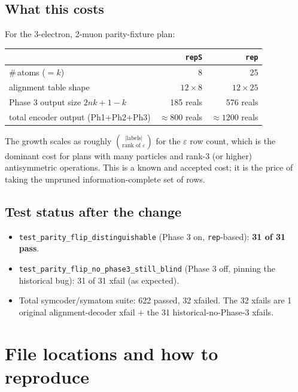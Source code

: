 \documentclass[a4paper,11pt]{article}
\begin{document}
\subsection{What this costs}

For the 3-electron, 2-muon parity-fixture plan:

\medskip
\noindent
\begin{tabular}{lrr}
\toprule
                                    & \texttt{repS}   & \texttt{rep} \\
\midrule
\#\,atoms ($=k$)                    & 8               & 25 \\
alignment table shape               & $12 \times 8$   & $12 \times 25$ \\
Phase 3 output size $2nk+1-k$       & 185 reals       & 576 reals \\
total encoder output (Ph1+Ph2+Ph3)  & $\approx 800$ reals & $\approx 1200$ reals \\
\bottomrule
\end{tabular}
\medskip

\noindent
The growth scales as roughly
$\binom{|\text{labels}|}{\text{rank of $\varepsilon$}}$ for the
$\varepsilon$ row count, which is the dominant cost for plans with
many particles and rank-3 (or higher) antisymmetric operations.  This
is a known and accepted cost; it is the price of taking the unpruned
information-complete set of rows.

\subsection{Test status after the change}

\begin{itemize}[nosep]
  \item \texttt{test\_parity\_flip\_distinguishable} (Phase 3 on,
        \texttt{rep}-based): \textbf{31 of 31 pass}.
  \item \texttt{test\_parity\_flip\_no\_phase3\_still\_blind}
        (Phase 3 off, pinning the historical bug): 31 of 31 xfail
        (as expected).
  \item Total symcoder/symatom suite: 622 passed, 32 xfailed.
        The 32 xfails are 1 original alignment-decoder xfail + the
        31 historical-no-Phase-3 xfails.
\end{itemize}

\section{File locations and how to reproduce}
\end{document}
